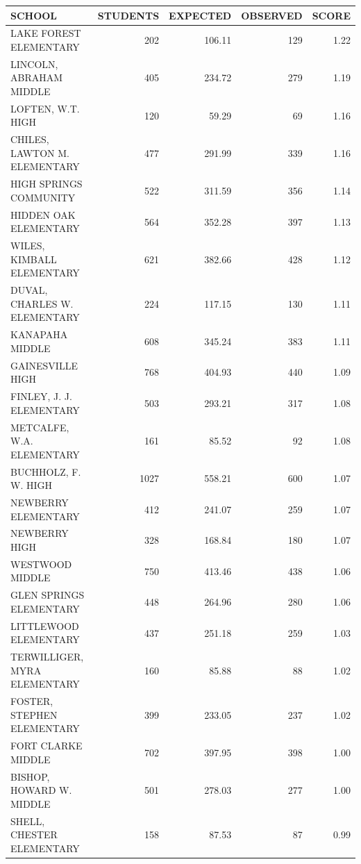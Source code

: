 \documentclass{article}
\begin{document}
\begin{table}[H]
\begin{table}[ht]
\centering
{\tiny
\begin{tabular}{lrrrr}
  \hline
SCHOOL & STUDENTS & EXPECTED & OBSERVED & SCORE \\ 
  \hline
LAKE FOREST ELEMENTARY & 202 & 106.11 & 129 & 1.22 \\ 
  LINCOLN, ABRAHAM MIDDLE  & 405 & 234.72 & 279 & 1.19 \\ 
  LOFTEN, W.T. HIGH  & 120 & 59.29 &  69 & 1.16 \\ 
  CHILES, LAWTON M. ELEMENTARY & 477 & 291.99 & 339 & 1.16 \\ 
  HIGH SPRINGS COMMUNITY  & 522 & 311.59 & 356 & 1.14 \\ 
  HIDDEN OAK ELEMENTARY & 564 & 352.28 & 397 & 1.13 \\ 
  WILES, KIMBALL ELEMENTARY & 621 & 382.66 & 428 & 1.12 \\ 
  DUVAL, CHARLES W. ELEMENTARY & 224 & 117.15 & 130 & 1.11 \\ 
  KANAPAHA MIDDLE  & 608 & 345.24 & 383 & 1.11 \\ 
  GAINESVILLE HIGH  & 768 & 404.93 & 440 & 1.09 \\ 
  FINLEY, J. J. ELEMENTARY & 503 & 293.21 & 317 & 1.08 \\ 
  METCALFE, W.A. ELEMENTARY & 161 & 85.52 &  92 & 1.08 \\ 
  BUCHHOLZ, F. W. HIGH  & 1027 & 558.21 & 600 & 1.07 \\ 
  NEWBERRY ELEMENTARY & 412 & 241.07 & 259 & 1.07 \\ 
  NEWBERRY HIGH  & 328 & 168.84 & 180 & 1.07 \\ 
  WESTWOOD MIDDLE  & 750 & 413.46 & 438 & 1.06 \\ 
  GLEN SPRINGS ELEMENTARY & 448 & 264.96 & 280 & 1.06 \\ 
  LITTLEWOOD ELEMENTARY & 437 & 251.18 & 259 & 1.03 \\ 
  TERWILLIGER, MYRA ELEMENTARY & 160 & 85.88 &  88 & 1.02 \\ 
  FOSTER, STEPHEN ELEMENTARY & 399 & 233.05 & 237 & 1.02 \\ 
  FORT CLARKE MIDDLE  & 702 & 397.95 & 398 & 1.00 \\ 
  BISHOP, HOWARD W. MIDDLE  & 501 & 278.03 & 277 & 1.00 \\ 
  SHELL, CHESTER ELEMENTARY & 158 & 87.53 &  87 & 0.99 \\ 

\end{tabular}}
\end{table}
\end{table}
\end{document}

